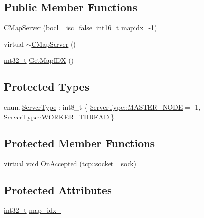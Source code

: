 \subsection*{Public Member Functions}
\begin{DoxyCompactItemize}
\item 
\hyperlink{classCMapServer_a7b684adad7c42a4e5346944eefadf8bb}{C\+Map\+Server} (bool \+\_\+isc=false, \hyperlink{stdint_8h_a269259c924dce846340ddbb810db2e3c}{int16\+\_\+t} mapidx=-\/1)
\item 
virtual \hyperlink{classCMapServer_ad8d59e4ffdb19d532ba39841e1a71c5c}{$\sim$\+C\+Map\+Server} ()
\item 
\hyperlink{stdint_8h_ab1967d8591af1a4e48c37fd2b0f184d0}{int32\+\_\+t} \hyperlink{classCMapServer_a32f94668a9c281bb756abb27555879c1}{Get\+Map\+I\+DX} ()
\end{DoxyCompactItemize}
\subsection*{Protected Types}
\begin{DoxyCompactItemize}
\item 
enum \hyperlink{classCMapServer_a6cfeacd7632a08bc2b12d37fb4fa3ffc}{Server\+Type} \+: int8\+\_\+t \{ \hyperlink{classCMapServer_a6cfeacd7632a08bc2b12d37fb4fa3ffca59c59426a33fb4498cd4e8c9cc330619}{Server\+Type\+::\+M\+A\+S\+T\+E\+R\+\_\+\+N\+O\+DE} = -\/1, 
\hyperlink{classCMapServer_a6cfeacd7632a08bc2b12d37fb4fa3ffcaf23d8032f692800f9da91040a57ee6d9}{Server\+Type\+::\+W\+O\+R\+K\+E\+R\+\_\+\+T\+H\+R\+E\+AD}
 \}
\end{DoxyCompactItemize}
\subsection*{Protected Member Functions}
\begin{DoxyCompactItemize}
\item 
virtual void \hyperlink{classCMapServer_ac9329021a750c230f141b25cfed46a61}{On\+Accepted} (tcp\+::socket \+\_\+sock)
\end{DoxyCompactItemize}
\subsection*{Protected Attributes}
\begin{DoxyCompactItemize}
\item 
\hyperlink{stdint_8h_ab1967d8591af1a4e48c37fd2b0f184d0}{int32\+\_\+t} \hyperlink{classCMapServer_aface94fa06dc496f2234f9b2ea883a23}{map\+\_\+idx\+\_\+}
\end{DoxyCompactItemize}
